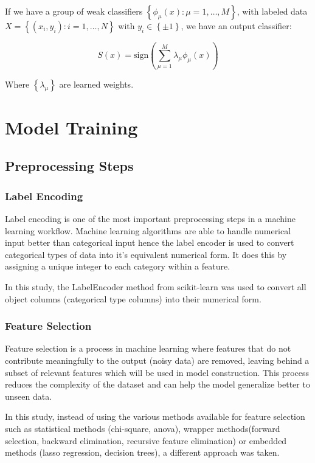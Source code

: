 \documentclass[12pt, a4paper,twoside]{report}
\numberwithin{equation}{chapter}
\begin{document}
If we have a group of weak classifiers \(\left\{ \phi_\mu(x): \mu = 1, \ldots, M \right\}\), with labeled data \(X = \left\{ (x_i, y_i): i = 1, \ldots, N \right\}\) with \(y_i \in \left\{ \pm 1 \right\}\), we have an output classifier:

\[S(x) = \text{sign}\left( \sum_{\mu=1}^M \lambda_\mu \phi_\mu(x) \right)\]

Where \(\left\{ \lambda_\mu \right\}\) are learned weights.



\section{Model Training}
\subsection{Preprocessing Steps}

\subsubsection{Label Encoding}
Label encoding is one of the most important preprocessing steps in a machine learning workflow. Machine learning algorithms are able to handle numerical input better than categorical input hence the label encoder is used to convert categorical types of data into it's equivalent numerical form. It does this by assigning a unique integer to each category within a feature.

In this study, the LabelEncoder method from scikit-learn was used to convert all object columns (categorical type columns) into their numerical form.

\subsubsection{Feature Selection}
Feature selection is a process in machine learning where features that do not contribute meaningfully to the output (noisy data) are removed, leaving behind a subset of relevant features which will be used in model construction. This process reduces the complexity of the dataset and can help the model generalize better to unseen data.

In this study, instead of using the various methods available for feature selection such as statistical methods (chi-square, anova), wrapper methods(forward selection, backward elimination, recursive feature elimination) or embedded methods (lasso regression, decision trees), a different approach was taken.
\end{document}
